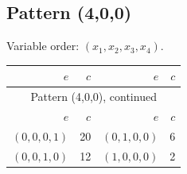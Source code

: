 \subsection{Pattern (4,0,0)}
Variable order: $(x_{1}, x_{2}, x_{3}, x_{4})$.
\begingroup\small
\setlength{\tabcolsep}{8pt}
\begin{longtable}{@{}rr@{\qquad}rr@{}}
\toprule
$e$&$c$&$e$&$c$\\\midrule
\endfirsthead
\multicolumn{4}{c}{Pattern (4,0,0), continued}\\
\toprule
$e$&$c$&$e$&$c$\\\midrule
\endhead
$(0,0,0,1)$&20&$(0,1,0,0)$&6\\
$(0,0,1,0)$&12&$(1,0,0,0)$&2\\
\bottomrule
\end{longtable}
\endgroup
